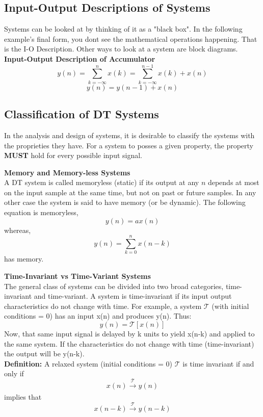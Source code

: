 \documentclass{article} %
\begin{document}
	\subsection{Input-Output Descriptions of Systems}
	Systems can be looked at by thinking of it as a "black box". In the following example's final form, you dont see the mathematical operations happening. That is the I-O Description. Other ways to look at a system are block diagrams.
	\textbf{Input-Output Description of Accumulator}
	\begin{equation}
 	y(n) = \sum_{k = -\infty}^n x(k) = \sum_{k = -\infty}^{n-1} x(k) + x(n)
	\end{equation}
	\begin{equation}
 	y(n) = y(n-1) + x(n)
	\end{equation}
	
	\subsection{Classification of DT Systems}
	
	In the analysis and design of systems, it is desirable to classify the systems with the proprieties they have. For a system to posses a given property, the property \textbf{MUST} hold for every possible input signal. 
	
	\textbf{Memory and Memory-less Systems}\\
	 A DT system is called memoryless (static) if its output at any $n$ depends at most on the input sample at the same time, but not on past or future samples. In any other case the system is said to have memory (or be dynamic). The following equation is memoryless, 
	\begin{equation}
 	y(n) = ax(n)
	\end{equation}
	whereas,
	\begin{equation}
 	y(n) = \sum_{k=0}^n x(n-k)
	\end{equation}
	has memory. 
	
	\textbf{Time-Invariant vs Time-Variant Systems}\\
	The general class of systems can be divided into two broad categories, time-invariant and time-variant. A system is time-invariant if its input output characteristics do not change with time. For example, a system $\mathcal{T}$ (with initial conditions = 0) has an input x(n) and produces y(n). Thus:
	\begin{equation}
 	 y(n) = \mathcal{T}[x(n)]
	\end{equation}
	Now, that same input signal is delayed by k units to yield x(n-k) and applied to the same system. If the characteristics do not change with time (time-invariant) the output will be y(n-k).\\ 
	\textbf{Definition:} A relaxed system (initial conditions = 0) $\mathcal{T}$ is time invariant if and only if 
	\begin{equation}
 	x(n) \xrightarrow[]{\mathcal{T}}  y(n)
	\end{equation}
	implies that 
	\begin{equation}
 	x(n-k) \xrightarrow[]{\mathcal{T}}  y(n-k)
	\end{equation}
	
\end{document}
